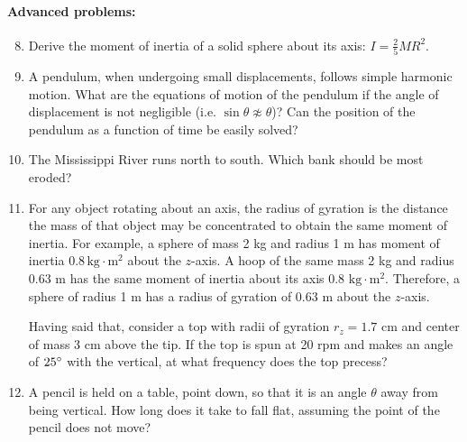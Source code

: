 \documentclass[12pt,letterpaper]{article}
\begin{document}
\paragraph{Advanced problems:}
\begin{enumerate}
\setcounter{enumi}{7}
\item
Derive the moment of inertia of a solid sphere about its axis: $I = \frac{2}{5}MR^2$.

\item
A pendulum, when undergoing small displacements, follows simple harmonic motion. What are the equations of motion of the pendulum if the angle of displacement is not negligible (i.e. $\sin\theta \not\approx \theta$)? Can the position of the pendulum as a function of time be easily solved?

\item
The Mississippi River runs north to south. Which bank should be most eroded?

\item
For any object rotating about an axis, the radius of gyration is the distance the mass of that object may be concentrated to obtain the same moment of inertia. For example, a sphere of mass 2 kg and radius 1 m has moment of inertia $0.8\,\text{kg}\cdot\text{m}^2$ about the $z$-axis. A hoop of the same mass 2 kg and radius 0.63 m has the same moment of inertia about its axis 0.8 $\text{kg}\cdot\text{m}^2$. Therefore, a sphere of radius 1 m has a radius of gyration of 0.63 m about the $z$-axis. 

Having said that, consider a top with radii of gyration $r_z = 1.7$ cm and center of mass 3 cm above the tip. If the top is spun at 20 rpm and makes an angle of $25\degree$ with the vertical, at what frequency does the top precess?

\item
A pencil is held on a table, point down, so that it is an angle $\theta$ away from being vertical. How long does it take to fall flat, assuming the point of the pencil does not move?
\end{enumerate}
\end{document}
